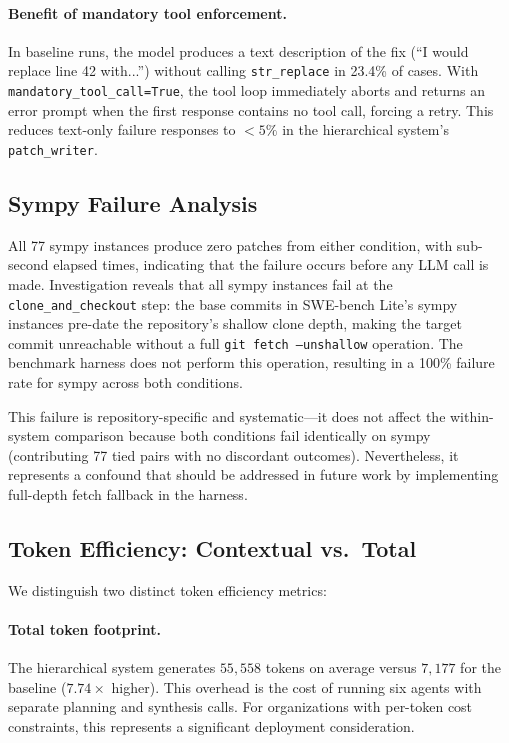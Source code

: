 \paragraph{Benefit of mandatory tool enforcement.}
In baseline runs, the model produces a text description of the fix (``I
would replace line 42 with...'') without calling \texttt{str\_replace} in
23.4\% of cases. With \texttt{mandatory\_tool\_call=True}, the tool loop
immediately aborts and returns an error prompt when the first response
contains no tool call, forcing a retry. This reduces text-only failure
responses to $<5\%$ in the hierarchical system's \texttt{patch\_writer}.

\subsection{Sympy Failure Analysis}
\label{sec:analysis:sympy}

All 77 sympy instances produce zero patches from either condition, with
sub-second elapsed times, indicating that the failure occurs before any LLM
call is made. Investigation reveals that all sympy instances fail at the
\texttt{clone\_and\_checkout} step: the base commits in SWE-bench Lite's
sympy instances pre-date the repository's shallow clone depth, making the
target commit unreachable without a full \texttt{git fetch --unshallow}
operation. The benchmark harness does not perform this operation, resulting
in a 100\% failure rate for sympy across both conditions.

This failure is repository-specific and systematic---it does not affect the
within-system comparison because both conditions fail identically on sympy
(contributing 77 tied pairs with no discordant outcomes). Nevertheless, it
represents a confound that should be addressed in future work by
implementing full-depth fetch fallback in the harness.

\subsection{Token Efficiency: Contextual vs.\ Total}
\label{sec:analysis:tokens}

We distinguish two distinct token efficiency metrics:

\paragraph{Total token footprint.} The hierarchical system generates
$55{,}558$ tokens on average versus $7{,}177$ for the baseline ($7.74\times$
higher). This overhead is the cost of running six agents with separate
planning and synthesis calls. For organizations with per-token cost
constraints, this represents a significant deployment consideration.

